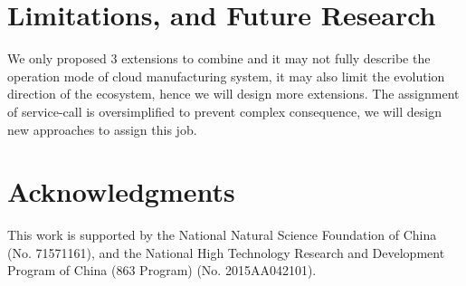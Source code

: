 \section{Limitations, and Future Research} %
\label{sec:contributions_limitations_and_future_research}
We only proposed 3 extensions to combine and it may not fully describe the operation mode of cloud manufacturing system, it may also limit the evolution direction of the ecosystem, hence we will design more extensions. The assignment of service-call is oversimplified to prevent complex consequence, we will design new approaches to assign this job.

\section{Acknowledgments} %
\label{sec:acknowledgments}
This work is supported by the National Natural Science Foundation of China (No. 71571161), and the National High Technology Research and Development Program of China (863 Program) (No. 2015AA042101). 
